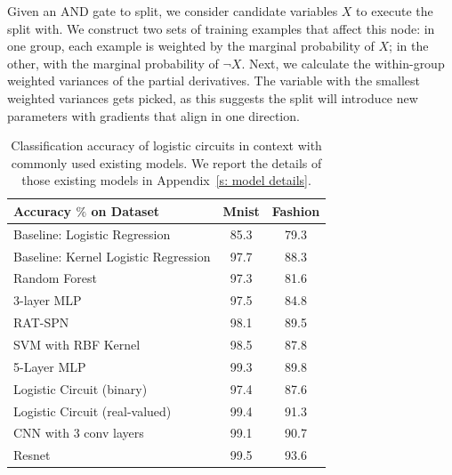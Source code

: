 \documentclass[letterpaper]{article} %
\begin{document}
Given an AND gate to split, we consider candidate variables $X$ to execute the split with. We construct two sets of training examples that affect this node: in one group, each example is weighted by the marginal probability of $X$; in the other,
with the marginal probability of $\neg X$.
Next, we calculate the within-group weighted variances of the partial derivatives.
The variable with the smallest weighted variances gets picked, as this suggests the split will introduce new parameters with gradients that align in one direction.

\begin{table}[t]
 \centering
 \begin{minipage}{0.48\textwidth}
          \caption{Classification accuracy of logistic circuits in context with commonly used existing models. We report the details of those existing models in Appendix~\ref{s: model details}.}
          \label{table: accuracy}
          \centering
          {\fontsize{8.5}{9}\selectfont
          \begin{sc}
          \begin{tabular}{ @{}l c c @{} }
          \toprule
       	Accuracy $\%$ on Dataset & Mnist & Fashion \\
          \midrule\midrule
           Baseline: Logistic Regression & 85.3 & 79.3 \\
           Baseline: Kernel Logistic Regression & 97.7 & 88.3 \\
           Random Forest & 97.3 & 81.6 \\
            3-layer MLP\label{3MLP}
 & 97.5 & 84.8\\
 	RAT-SPN \cite{rat-spn2018} &98.1 & 89.5\\
	SVM with RBF Kernel & 98.5 & 87.8 \\
	            5-Layer MLP  & 99.3 & 89.8 \\
            \midrule
          Logistic Circuit (binary) &  97.4 & 87.6 \\
          Logistic Circuit (real-valued) & 99.4 & 91.3\\
          \midrule
            CNN with 3 conv layers & 99.1  &90.7\\
            Resnet \cite{he2016cvpr}& 99.5 & 93.6 \\
		\bottomrule
		\end{tabular}
          \end{sc}
     }
     \end{minipage}
   \end{table}
\end{document}
